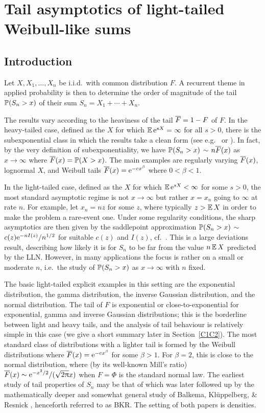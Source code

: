 \chapter{Tail asymptotics of light-tailed Weibull-like sums}

\section{Introduction}\label{S:Intr}

Let $X,X_1,\ldots,X_n$ be i.i.d.\ with common distribution $F$. A recurrent theme in applied probability is then
to determine the order of magnitude of the tail $\operatorname{{\mathbb P}}(S_n>x)$ of their sum $S_n=X_1+\cdots+X_n$.

The results vary according to the heaviness  of the tail $\overline F=1-F$ of $F$. In the heavy-tailed case, defined as the $X$ for which $\operatorname{{\mathbb E}}\mathrm{e}^{sX}=\infty$ for all $s>0$, there is the subexponential class in which the results take a clean form (see e.g.\ \cite{embrechts2013modelling} or \cite{asmussen2010ruin}). In fact, by the
very definition of subexponentiality, we have $\operatorname{{\mathbb P}}(S_n>x)$ $\sim$ $n\overline F(x)$ as $x\to\infty$ where $\overline F(x)=\operatorname{{\mathbb P}}(X>x)$. The main examples are regularly varying $\overline F(x)$, lognormal $X$, and Weibull tails $\overline F(x)=\mathrm{e}^{-cx^\beta}$ where $0<\beta<1$.

In the light-tailed case, defined as the $X$ for which $\operatorname{{\mathbb E}}\mathrm{e}^{sX}<\infty$ for some $s>0$, the most standard asymptotic regime is not $x\to\infty$ but rather
$x=x_n$ going to $\infty$ at rate $n$. For example, let $x_n=nz$ for some $z$, where typically $z>\operatorname{{\mathbb E}} X$ in order to make the problem a rare-event one.
Under some regularity conditions, the sharp asymptotics are then given by the saddlepoint approximation $\operatorname{{\mathbb P}}(S_n>x)$ $\sim$
$c(z)\mathrm{e}^{-nI(z)}/n^{1/2}$ for suitable $c(z)$ and $I(z)$, cf.\ \cite{jensen1995saddlepoint}. This is a large deviations result, describing how likely
it is for $S_n$ to be far from the value $n\operatorname{{\mathbb E}} X$ predicted by the LLN. However, in many applications the focus is rather on a small
or moderate $n$, i.e.\ the study of  $\operatorname{{\mathbb P}}(S_n>x)$ as $x\to\infty$ with $n$ fixed.

The basic light-tailed explicit examples in this setting are the exponential distribution, the gamma distribution,
the inverse Gaussian distribution,  and the normal distribution. The tail of $F$ is exponential or close-to-exponential for exponential, gamma and inverse Gaussian distributions; this is the borderline between light and heavy tails, and the analysis of tail behaviour is relatively simple in this case (we give a short summary
later in Section~\ref{C1C2}).
The most standard class of distributions with a lighter tail is formed by the Weibull distributions where
$\overline F(x)=\mathrm{e}^{-cx^\beta}$ for some $\beta>1$. For $\beta=2$, this is close to the normal distribution, where (by its well-known Mill's ratio) $\overline F(x)\sim \mathrm{e}^{-x^2/2}/(\sqrt{2\uppi}x)$ when $F = \Phi$ is the standard normal law. The earliest study of  tail properties of $S_n$ may be that
of \cite{rootzen1987ratio} which was later followed up by the mathematically deeper and somewhat general study of Balkema, Kl\"uppelberg, \& Resnick \cite{balkema1993densities}, henceforth referred to as BKR. The setting of both papers is densities.

